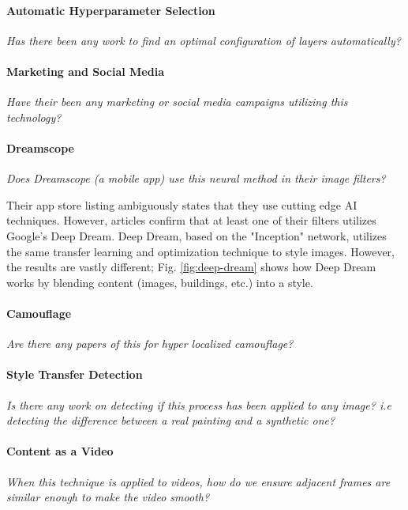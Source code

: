\documentclass{article}
\begin{document}
\paragraph{Automatic Hyperparameter Selection} \textit{Has there been any
work to find an optimal configuration of layers automatically?}

\paragraph{Marketing and Social Media} \textit{Have their been any marketing
or social media campaigns utilizing this technology?}

\paragraph{Dreamscope} \textit{Does Dreamscope (a mobile app) use this
neural method in their image filters?}



Their app store listing ambiguously states that they use cutting edge AI
techniques. However, articles confirm that at least one of their filters
utilizes Google's Deep Dream. Deep Dream, based on the "Inception" network,
utilizes the same transfer learning and optimization technique to style
images. However, the results are vastly different; Fig. \ref{fig:deep-dream}
shows how Deep Dream works by blending content (images, buildings, etc.)
into a style.

\paragraph{Camouflage} \textit{Are there any papers of this for hyper
localized camouflage?}

\paragraph{Style Transfer Detection} \textit{Is there any work on detecting
if this process has been applied to any image? i.e detecting the difference
between a real painting and a synthetic one?}

\paragraph{Content as a Video} \textit{When this technique is applied to
videos, how do we ensure adjacent frames are similar enough to make the video
smooth?}
\end{document}
